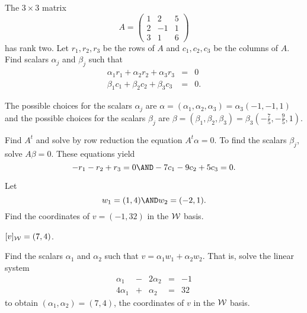\documentclass{article}
\begin{document}



\problemlabel

\begin{exercise} \label{c5.8.1}
The $3\times 3$ matrix
\[
A = \left(\begin{array}{rrr} 1 & 2 & 5\\ 2 & -1 & 1\\ 3 & 1 & 6
\end{array}\right)
\]
has rank two.  Let $r_1,r_2,r_3$ be the rows of $A$ and
$c_1,c_2,c_3$ be the columns of $A$. Find scalars $\alpha_j$ and
$\beta_j$ such that
\begin{eqnarray*}
\alpha_1r_1+\alpha_2r_2+\alpha_3r_3 & = & 0 \\
\beta_1c_1+\beta_2c_2+\beta_3c_3 & = & 0.
\end{eqnarray*}

\begin{solution}

\ans The possible choices for the scalars $\alpha_j$ are
$\alpha = (\alpha_1,\alpha_2,\alpha_3) = \alpha_3(-1,-1,1)$ and
the possible choices for the scalars $\beta_j$ are $\beta = 
(\beta_1,\beta_2,\beta_3) = \beta_3(-\frac{7}{5},-\frac{9}{5},1)$.

\soln Find $A^t$ and solve by row reduction the equation
$A^t\alpha = 0$.  To find the scalars $\beta_j$, solve $A\beta =
0$.  These equations yield
\[
-r_1 - r_2 + r_3 = 0 \AND -7c_1 - 9c_2 + 5c_3 = 0.
\]

\end{solution}
\end{exercise}





\problemlabel

\begin{exercise} \label{c7.1.1}
Let
\[
w_1 = (1,4) \AND w_2 = (-2,1).
\]
Find the coordinates of $v=(-1,32)$ in the ${\cal W}$ basis.

\begin{solution}

\ans $[v]_{\cal W} = (7,4)$.

\soln Find the scalars $\alpha_1$ and $\alpha_2$ such that $v = \alpha_1w_1
+ \alpha_2w_2$.  That is, solve the linear system
\[ \begin{array}{rrrrr}
\alpha_1 & - & 2\alpha_2 & = & -1 \\
4\alpha_1 & + & \alpha_2 & = & 32 \end{array} \]
to obtain $(\alpha_1,\alpha_2) = (7,4)$, the coordinates
of $v$ in the ${\cal W}$ basis.

\end{solution}
\end{exercise}
\end{document}
